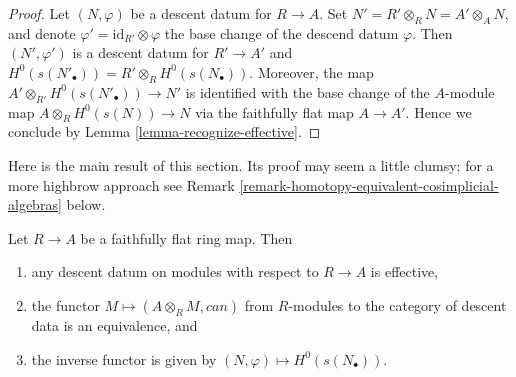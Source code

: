 \begin{proof}
Let $(N, \varphi)$ be a descent datum for $R \to A$.
Set $N' = R' \otimes_R N = A' \otimes_A N$, and denote
$\varphi' = \text{id}_{R'} \otimes \varphi$ the base change
of the descend datum $\varphi$. Then $(N', \varphi')$ is
a descent datum for $R' \to A'$ and
$H^0(s(N'_\bullet)) = R' \otimes_R H^0(s(N_\bullet))$.
Moreover, the map
$A' \otimes_{R'} H^0(s(N'_\bullet)) \to N'$ is identified
with the base change of the $A$-module map
$A \otimes_R H^0(s(N)) \to N$ via the faithfully flat map
$A \to A'$. Hence we conclude by Lemma \ref{lemma-recognize-effective}.
\end{proof}

\noindent
Here is the main result of this section.
Its proof may seem a little clumsy; for a more highbrow approach see
Remark \ref{remark-homotopy-equivalent-cosimplicial-algebras} below.

\begin{proposition}
\label{proposition-descent-module}
Let $R \to A$ be a faithfully flat ring map.
Then
\begin{enumerate}
\item any descent datum on modules with respect to $R \to A$
is effective,
\item the functor $M \mapsto (A \otimes_R M, can)$ from $R$-modules
to the category of descent data is an equivalence, and
\item the inverse functor is given by $(N, \varphi) \mapsto H^0(s(N_\bullet))$.
\end{enumerate}
\end{proposition}

